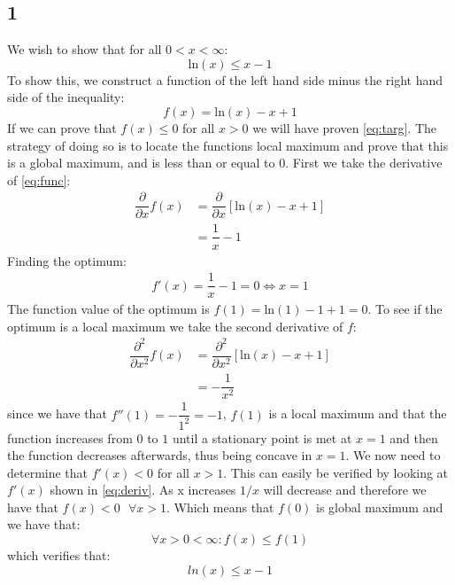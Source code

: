 \documentclass{article}
\begin{document}
\subsection{1}
We wish to show that for all $0 < x < \infty$:
\begin{equation}
\label{eq:targ}
\text{ln}(x) \leq x -1
\end{equation}
To show this, we construct a function of the left hand side minus the right hand side of the inequality:
\begin{equation}
\label{eq:func}
f(x) = \text{ln}(x) - x + 1
\end{equation}
If we can prove that $f(x) \leq 0$ for all $x>0$ we will have proven \eqref{eq:targ}. The strategy of doing so is to locate the functions local maximum and prove that this is a global maximum, and is less than or equal to 0. First we take the derivative of \eqref{eq:func}:
\begin{align}
\dfrac{\partial}{\partial x} f(x) &= \dfrac{\partial}{\partial x} \left[ \text{ln}(x) - x + 1 \right] \\
\label{eq:deriv}
&= \dfrac{1}{x} - 1
\end{align}
Finding the optimum:
\begin{align}
f'(x) = \dfrac{1}{x} - 1 = 0 \Leftrightarrow x = 1
\end{align}
The function value of the optimum is $f(1) = \text{ln}(1) - 1 + 1 = 0$. To see if the optimum is a local maximum we take the second derivative of $f$:
\begin{align}
\dfrac{\partial^2}{\partial x^2} f(x) &= \dfrac{\partial^2}{\partial x^2} \left[ \text{ln}(x) -x + 1 \right] \\
&= -\dfrac{1}{x^2}
\end{align} since we have that $f''(1) = - \dfrac{1}{1^2} = -1$, $f(1)$ is a local maximum and that the function increases from $0$ to $1$ until a stationary point is met at $x=1$ and then the function decreases afterwards, thus being concave in $x=1$. We now need to determine that $f'(x) < 0$ for all $x>1$. This can easily be verified by looking at $f'(x)$ shown in \eqref{eq:deriv}. As x increases $1/x$ will decrease and therefore we have that $f(x) < 0 \text{ } \forall
 x > 1$. Which means that $f(0)$ is global maximum and we have that:
$$
\forall x > 0 < \infty : f(x) \leq f(1)
$$
which verifies that:
$$
ln(x) \leq x-1
$$
\end{document}
